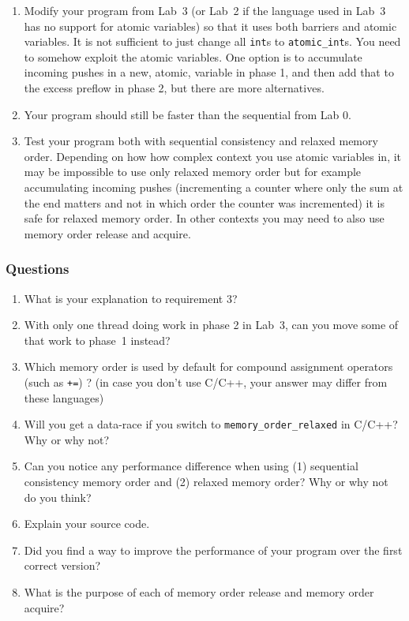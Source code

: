 \documentclass{forsete}
\begin{document}
{\begin{enumerate}
\item Modify your program from Lab~3 (or Lab~2 if the language used in Lab~3 has no support for atomic variables)
so that it uses both barriers and atomic variables. It is not sufficient to just change all
\verb.int.s to \verb.atomic_int.s. You need to somehow exploit the atomic variables. One option is
to accumulate incoming pushes in a new, atomic, variable in phase 1, and then add that to the
excess preflow in phase 2, but there are more alternatives.
\item Your program should still be faster than the sequential from Lab 0.

\item Test your program both with sequential consistency and relaxed memory order. Depending on how
how complex context you use atomic variables in, it may be impossible to use only relaxed memory order but for
example accumulating incoming pushes (incrementing a counter where only the sum at the end matters
and not in which order the counter was incremented) it is safe for relaxed memory order. 
In other contexts you may need to also use memory order release and acquire.
\end{enumerate}

\subsubsection*{Questions}
\begin{enumerate}
\item What is your explanation to requirement 3?
\item With only one thread doing work in phase 2 in Lab~3, can you move some of that work to phase~1 instead?
\item Which memory order is used by default for compound assignment operators (such as \verb.+=.) ?  (in case you don't use C/C++, your answer may differ from these languages)
\item Will you get a data-race if you switch to \verb.memory_order_relaxed. in C/C++? Why or why not?
\item Can you notice any performance difference when using (1) sequential consistency memory order
and (2) relaxed memory order? Why or why not do you think?
\item Explain your source code.
\item Did you find a way to improve the performance of your program over the first correct version?
\item What is the purpose of each of memory order release and memory order acquire?


\end{enumerate}}
\end{document}
